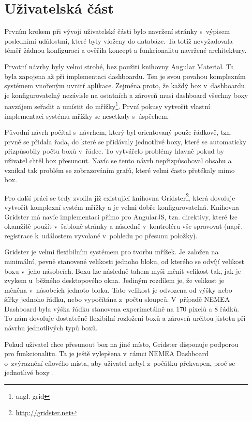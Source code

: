 \section{Uživatelská část}

Prvním krokem při vývoji uživatelské části bylo navržení stránky s~výpisem posledními událostmi, které byly vloženy do databáze. Ta totiž nevyžadovala téměř žádnou konfiguraci a ověřila koncept a funkcionalitu navržené architektury.

Prvotní návrhy byly velmi strohé, bez použití knihovny Angular Material. Ta byla zapojena až při implementaci dashboardu. Ten je svou povahou komplexním systémem vnořeným uvnitř aplikace. Zejména proto, že každý box v~dashboardu je konfigurovatelný nezávisle na ostatních a zároveň musí dashboard všechny boxy navzájem seřadit a umístit do mřížky\footnote{angl. grid}. První pokusy vytvořit vlastní implementaci systému mřížky se nesetkaly s~úspěchem.

Původní návrh počítal s~návrhem, který byl orientovaný použe řádkově, tzn. prvně se přidala řada, do které se přidávaly jednotlivé boxy, které se automaticky přizpůsobily počtu boxů v~řádce. To vytvářelo problémy hlavně pokud by uživatel chtěl box přesunout. Navíc se tento návrh nepřizpůsoboval obsahu a vznikal tak problém se zobrazováním grafů, které velmi často přetékaly mimo box.

Pro další práci se tedy zvolila již existující knihovna Gridster\footnote{\url{http://gridster.net}}, která dovoluje vytvořit komplexní systém mřížky a je velmi dobře konfigurovatelná. Knihovna Gridster má navíc implementaci přímo pro AngularJS, tzn. direktivy, které lze okamžitě použít v~šabloně stránky a následně v~kontroléru vše spravovat (např. registrace k~událostem vyvolané v~pohledu po přesunu položky).

Gridster je velmi flexibilním systémem pro tvorbu mřížek. Je založen na minimální, pevně stanovené velikosti jednoho bloku, od kterého se odvíjí velikost boxu v~jeho násobcích. Boxu lze následně tahem myši měnit velikost tak, jak je zvykem u~běžného desktopového okna. Jediným rozdílem je, že velikost je měněna v~násobcích jednoto bloku. Tato velikost je odvozena od výšky nebo šířky jednoho řádku, nebo vypočítána z~počtu sloupců. V~případě NEMEA Dashboard byla výška řádku stanovena experimetálně na 170 pixelů a 8 řádků. To nám dovoluje dostatečně flexibilní rozložení boxů a zároveň určitou jistotu při návrhu jednotlivých typů boxů.

Pokud uživatel chce přesunout box na jiné místo, Gridster disponuje podporou pro  funkcionalitu. Ta je ještě vylepšena v~rámci NEMEA Dashboard o~zvýraznění cílového místa, aby uživatel nebyl z~počátku překvapen, proč se jednotlivé boxy .

